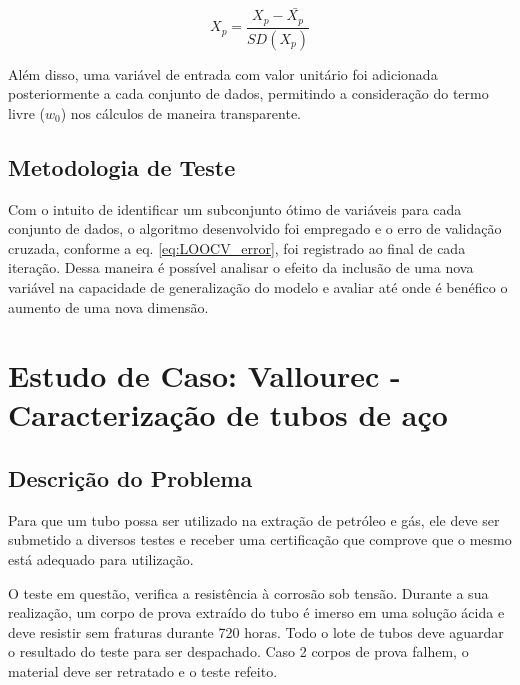 \begin{equation}
    X_p = \frac{ X_p - \bar{X_p} }{SD(X_p)}
    \label{eq:z-score}
\end{equation}

Além disso, uma variável de entrada com valor unitário foi adicionada posteriormente a cada conjunto de dados, permitindo a consideração do termo livre ($w_0$) nos cálculos de maneira transparente.

\subsection{Metodologia de Teste}

Com o intuito de identificar um subconjunto ótimo de variáveis para cada conjunto de dados, o algoritmo 
desenvolvido foi empregado e o erro de validação cruzada, conforme a eq. \ref{eq:LOOCV_error}, foi registrado ao final de cada iteração. Dessa maneira é possível analisar o efeito da inclusão de uma nova variável na capacidade de generalização do modelo e avaliar até onde é benéfico o aumento de uma nova dimensão.

\section{Estudo de Caso: Vallourec - Caracterização de tubos de aço}

\subsection{Descrição do Problema}

Para que um tubo possa ser utilizado na extração de petróleo e gás, ele deve ser submetido a diversos testes e receber uma certificação que comprove que o mesmo está adequado para utilização.

O teste em questão, verifica a resistência à corrosão sob tensão. Durante a sua realização, um corpo de prova extraído do tubo é imerso em uma solução ácida e deve resistir sem fraturas durante 720 horas. Todo o lote de tubos deve aguardar o resultado do teste para ser despachado. Caso 2 corpos de prova falhem, o material deve ser retratado e o teste refeito. 

